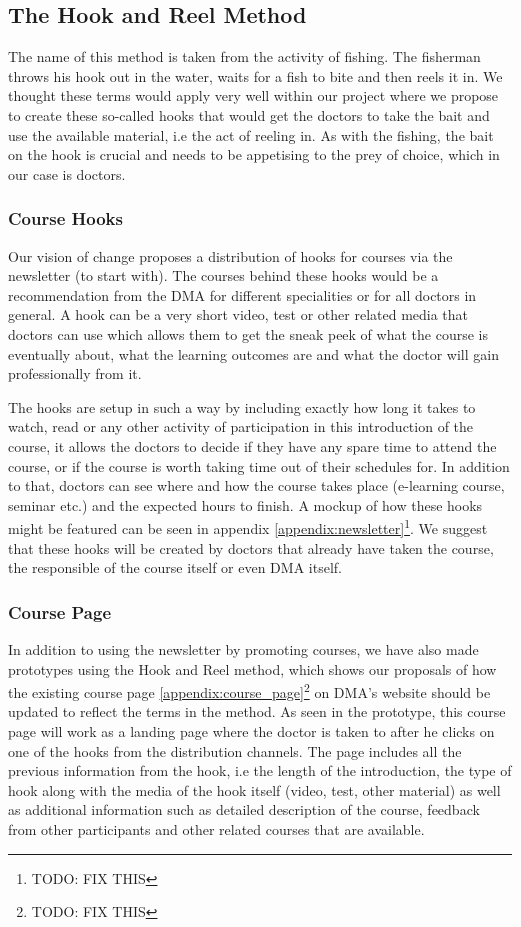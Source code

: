 \subsection{The Hook and Reel Method}
The name of this method is taken from the activity of fishing. The fisherman throws his hook out in the water, waits for a fish to bite and then reels it in. We thought these terms would apply very well within our project where we propose to create these so-called hooks that would get the doctors to take the bait and use the available material, i.e the act of reeling in. As with the fishing, the bait on the hook is crucial and needs to be appetising to the prey of choice, which in our case is doctors.

\subsubsection{Course Hooks}
Our vision of change proposes a distribution of hooks for courses via the newsletter (to start with). The courses behind these hooks would be a recommendation from the DMA for different specialities or for all doctors in general. A hook can be a very short video, test or other related media that doctors can use which allows them to get the sneak peek of what the course is eventually about, what the learning outcomes are and what the doctor will gain professionally from it.

The hooks are setup in such a way by including exactly how long it takes to watch, read or any other activity of participation in this introduction of the course, it allows the doctors to decide if they have any spare time to attend the course, or if the course is worth taking time out of their schedules for. In addition to that, doctors can see where and how the course takes place (e-learning course, seminar etc.) and the expected hours to finish. A mockup of how these hooks might be featured can be seen in appendix \ref{appendix:newsletter}\footnote{TODO: FIX THIS}. We suggest that these hooks will be created by doctors that already have taken the course, the responsible of the course itself or even DMA itself.

\subsubsection{Course Page}
In addition to using the newsletter by promoting courses, we have also made prototypes using the Hook and Reel method, which shows our proposals of how the existing course page \ref{appendix:course_page}\footnote{TODO: FIX THIS} on DMA’s website should be updated to reflect the terms in the method. As seen in the prototype, this course page will work as a landing page where the doctor is taken to after he clicks on one of the hooks from the distribution channels. The page includes all the previous information from the hook, i.e the length of the introduction, the type of hook along with the media of the hook itself (video, test, other material) as well as additional information such as detailed description of the course, feedback from other participants and other related courses that are available.



